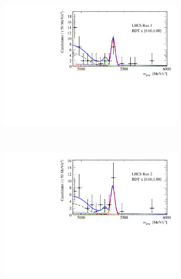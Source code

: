 {\begin{figure}[tbp]
\begin{subfigure}[b]{0.48\textwidth}
        \includegraphics[width=\textwidth]{./Figs/BFAnalysis/Fig17d.pdf}
    \end{subfigure}
    ~ %
    \begin{subfigure}[b]{0.48\textwidth}
       \includegraphics[width=\textwidth]{./Figs/BFAnalysis/Fig17h.pdf}
    \end{subfigure}


\end{figure}}
